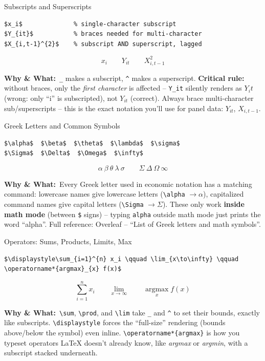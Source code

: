 \documentclass[11pt,aspectratio=169]{beamer}
\newcommand{\whybox}[1]{%
  \vspace{2pt}
  {\scriptsize\raggedright\textcolor{red!55!black}{\textbf{Why \& What:}}~#1\par}
}
\begin{document}
\begin{frame}[fragile]{Subscripts and Superscripts}
  \begin{lstlisting}
$x_i$              % single-character subscript
$Y_{it}$           % braces needed for multi-character
$X_{i,t-1}^{2}$    % subscript AND superscript, lagged
  \end{lstlisting}
  \begin{outputbox}
    \[ x_i \qquad Y_{it} \qquad X_{i,t-1}^{2} \]
  \end{outputbox}
  \whybox{\texttt{\_} makes a subscript, \texttt{\textasciicircum}
  makes a superscript. \textbf{Critical rule:} without braces, only
  the \emph{first character} is affected -- \texttt{Y\_it} silently
  renders as $Y_it$ (wrong: only ``i'' is subscripted), not $Y_{it}$
  (correct). Always brace multi-character sub/superscripts -- this is
  the exact notation you'll use for panel data: $Y_{it}$, $X_{i,t-1}$.}
\end{frame}

\begin{frame}[fragile]{Greek Letters and Common Symbols}
  \begin{lstlisting}
$\alpha$  $\beta$  $\theta$  $\lambda$  $\sigma$
$\Sigma$  $\Delta$  $\Omega$  $\infty$
  \end{lstlisting}
  \begin{outputbox}
    \[ \alpha\ \beta\ \theta\ \lambda\ \sigma\qquad
       \Sigma\ \Delta\ \Omega\ \infty \]
  \end{outputbox}
  \whybox{Every Greek letter used in economic notation has a matching
  command: lowercase names give lowercase letters
  (\texttt{\textbackslash alpha} $\to\alpha$), capitalized command
  names give capital letters (\texttt{\textbackslash Sigma}
  $\to\Sigma$). These only work \textbf{inside math mode} (between
  \texttt{\$} signs) -- typing \texttt{alpha} outside math mode just
  prints the word ``alpha''. Full reference: Overleaf -- ``List of
  Greek letters and math symbols''.}
\end{frame}

\begin{frame}[fragile]{Operators: Sums, Products, Limits, Max}
  \begin{lstlisting}
$\displaystyle\sum_{i=1}^{n} x_i \qquad \lim_{x\to\infty} \qquad
\operatorname*{argmax}_{x} f(x)$
  \end{lstlisting}
  \begin{outputbox}
    \[ \displaystyle\sum_{i=1}^{n} x_i \qquad \lim_{x\to\infty} \qquad
       \operatorname*{argmax}_{x} f(x) \]
  \end{outputbox}
  \whybox{\texttt{\textbackslash sum}, \texttt{\textbackslash prod}, and
  \texttt{\textbackslash lim} take \texttt{\_} and
  \texttt{\textasciicircum} to set their bounds, exactly like
  subscripts. \texttt{\textbackslash displaystyle} forces the
  ``full-size'' rendering (bounds above/below the symbol) even inline.
  \texttt{\textbackslash operatorname*\{argmax\}} is how you typeset
  operators LaTeX doesn't already know, like \emph{argmax} or
  \emph{argmin}, with a subscript stacked underneath.}
\end{frame}
\end{document}
